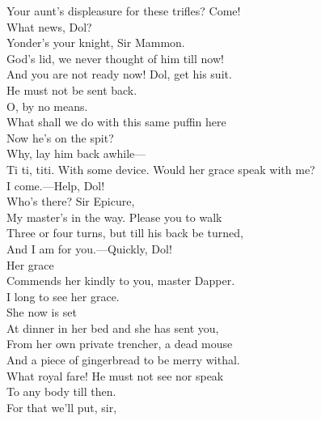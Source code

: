 \documentclass[a4paper,oneside,12pt]{memoir}
\begin{document}
\begin{drama*}
Your aunt's displeasure for these trifles? Come!\\
\subtlespeaks What news, Dol?\\
\dolspeaks {} Yonder's your knight, Sir Mammon.\\
\facespeaks God's lid, we never thought of him till now!\\
\subtlespeaks And you are not ready now! Dol, get his suit.\\
He must not be sent back.\\
\facespeaks {} O, by no means.\\
What shall we do with this same puffin here\\
Now he's on the spit?\\
\subtlespeaks {} Why, lay him back awhile---\\
\dolspeaks Ti ti, titi.
\subtlespeaks With some device. Would her grace speak with me?\\
I come.---Help, Dol!\\
\facespeaks {}  Who's there? Sir Epicure,\\
My master's in the way. Please you to walk\\
Three or four turns, but till his back be turned,\\
And I am for you.---Quickly, Dol!\\
\subtlespeaks {} Her grace\\
Commends her kindly to you, master Dapper.\\
\dapperspeaks I long to see her grace.\\
\subtlespeaks {} She now is set\\
At dinner in her bed and she has sent you,\\
From her own private trencher, a dead mouse\\
And a piece of gingerbread to be merry withal.\\
\facespeaks What royal fare!
\subtlespeaks {} He must not see nor speak\\
To any body till then.\\
\facespeaks {} For that we'll put, sir,\\

\end{drama*}
\end{document}
